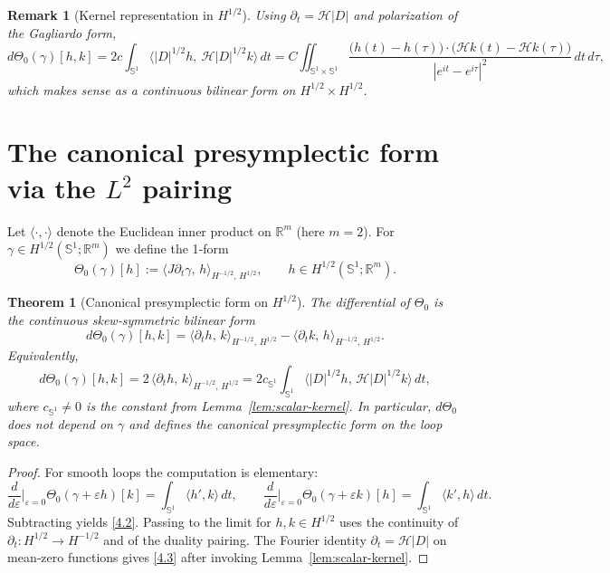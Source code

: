 \documentclass{amsart}
\newcounter{thm}
\newcounter{re}
\newtheorem{theorem}[thm]{Theorem}
\newtheorem{remark}[thm]{Remark}
\begin{document}
\begin{remark}[Kernel representation in $H^{1/2}$]
Using $\partial_t=\mathcal H|D|$ and polarization of the Gagliardo form,
\[
d\Theta_0(\gamma)[h,k]
=2c\int_{\mathbb S^1}\!\langle |D|^{1/2}h,\ \mathcal H|D|^{1/2}k\rangle\,dt
= C\iint_{\mathbb S^1\times\mathbb S^1}
\frac{\big(h(t)-h(\tau)\big)\cdot\big(\mathcal H k(t)-\mathcal H k(\tau)\big)}
{|e^{it}-e^{i\tau}|^{2}}\,dt\,d\tau,
\]
which makes sense as a continuous bilinear form on $H^{1/2}\times H^{1/2}$.
\end{remark}
\section{The canonical presymplectic form via the \(L^{2}\) pairing}
\label{sec:presymp}

Let \(\langle\cdot,\cdot\rangle\) denote the Euclidean inner product on \(\mathbb R^{m}\) (here \(m=2\)).
For \(\gamma\in H^{1/2}(\mathbb S^{1};\mathbb R^{m})\) we define the 1‑form
\[
\Theta_{0}(\gamma)[h]
   :=\big\langle J\partial_{t}\gamma,\,h\big\rangle_{H^{-1/2},\,H^{1/2}},
   \qquad h\in H^{1/2}(\mathbb S^{1};\mathbb R^{m}).
\tag{4.1}
\]

\begin{theorem}[Canonical presymplectic form on \(H^{1/2}\)]
\label{th:presymp-H12}
The differential of \(\Theta_{0}\) is the continuous skew‑symmetric bilinear form
\[
d\Theta_{0}(\gamma)[h,k]
   =\big\langle\partial_{t}h,\,k\big\rangle_{H^{-1/2},\,H^{1/2}}
    -\big\langle\partial_{t}k,\,h\big\rangle_{H^{-1/2},\,H^{1/2}} .
\label{4.2}
\]
Equivalently,
\begin{equation}
d\Theta_{0}(\gamma)[h,k]
   =2\,\big\langle\partial_{t}h,\,k\big\rangle_{H^{-1/2},\,H^{1/2}}
   =2c_{\mathbb S^{1}}
     \int_{\mathbb S^{1}}\big\langle|D|^{1/2}h,\,
                               \mathcal H|D|^{1/2}k\big\rangle\,dt,
\label{4.3}
\end{equation}
where \(c_{\mathbb S^{1}}\neq0\) is the constant from Lemma~\ref{lem:scalar-kernel}.
In particular, \(d\Theta_{0}\) does not depend on \(\gamma\) and defines the canonical
presymplectic form on the loop space.
\end{theorem}
\begin{proof}
For smooth loops the computation is elementary:
\[
\frac{d}{d\varepsilon}\Big|_{\varepsilon=0}
   \Theta_{0}(\gamma+\varepsilon h)[k]
   =\int_{\mathbb S^{1}}\langle h',k\rangle\,dt,
\qquad
\frac{d}{d\varepsilon}\Big|_{\varepsilon=0}
   \Theta_{0}(\gamma+\varepsilon k)[h]
   =\int_{\mathbb S^{1}}\langle k',h\rangle\,dt.
\]
Subtracting yields \eqref{4.2}.  Passing to the limit for
\(h,k\in H^{1/2}\) uses the continuity of \(\partial_{t}:H^{1/2}\to H^{-1/2}\) and of the duality pairing.
The Fourier identity \(\partial_{t}= \mathcal H|D|\) on mean‑zero functions gives \eqref{4.3}
after invoking Lemma~\ref{lem:scalar-kernel}.
\end{proof}
\end{document}
